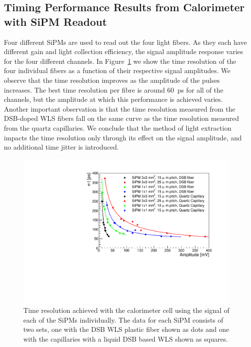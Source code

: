 \subsection{Timing Performance Results from Calorimeter with SiPM Readout}
\label{sec:beamtiming}

Four different SiPMs are used to read out the four light fibers. As they each have
different gain and light collection efficiency, the signal amplitude response varies
for the four different channels. In Figure~\ref{TimeResolution} we show the time 
resolution of the four individual fibers as a function of their respective signal 
amplitudes. We observe that the time resolution improves as the amplitude of the pulses 
increases. The best time resolution per fibre is around $60$~ps for all of the channels, 
but the amplitude at which this performance is achieved varies.
Another important observation is that the time resolution measured from
the DSB-doped WLS fibers fall on the same curve as the time resolution measured from
the quartz capillaries. We conclude that the method of light extraction
impacts the time resolution only through its effect on the signal amplitude, and
no additional time jitter is introduced. 


\begin{figure}[htb]
\centering
\includegraphics[width=0.99\textwidth]{figures/ShashlikTimeResolution.pdf}
\caption{\label{TimeResolution} Time resolution achieved with the calorimeter cell using the signal of each 
of the  SiPMs individually. The data for each SiPM consists of two sets, one with the DSB WLS plastic fiber shown as 
dots and one with the capillaries with a liquid DSB based WLS shown as squares. }
\end{figure}



